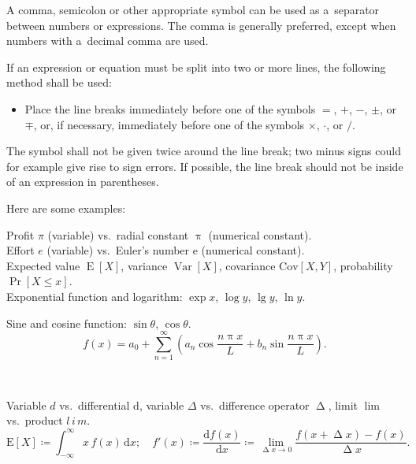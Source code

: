 \documentclass[11pt, a4paper, oneside]{article}
\newlength{\baselinedist}
\newlength{\smalllinespacing}
\renewenvironment{quotation}{%
	\list{}{%
		\baselineskip = \smalllinespacing%
		\leftmargin = \baselineskip%
		\rightmargin = \leftmargin%
		\listparindent = \smalllinespacing%
		\parsep = 0pt%
		\topsep = 0.5\baselinedist plus 3ex
	}%
	\item\relax%
}{%
	\endlist%
}
\newcommand{\dd}{\mathrm{d}}
\theoremstyle{Plain}
\theoremstyle{Definition}
\theoremstyle{Remark}
\begin{document}
\begin{quotation}
	A comma, semicolon or other appropriate symbol can be used as a~separator between numbers or expressions. The comma is generally preferred, except when numbers with a~decimal comma are used. \par
	If an expression or equation must be split into two or more lines, the following method shall be used:
	\begin{itemize}[leftmargin = \baselineskip, labelsep = 0.25\baselineskip]
		\item[---] Place the line breaks immediately before one of the symbols $=$, $+$, $-$, $\pm$, or $\mp$, or, if necessary, immediately before one of the symbols $\times$, $\cdot$, or $/$.
	\end{itemize}
	The symbol shall not be given twice around the line break; two minus signs could for example give rise to sign errors. If possible, the line break should not be inside of an expression in parentheses.
\end{quotation}

Here are some examples:

\begin{longtblr}{}
	Profit $\pi$ (variable) vs.\ radial constant $\uppi$ (numerical constant). \\
	Effort $e$ (variable) vs.\ Euler's number $\mathrm{e}$ (numerical constant). \\
	Expected value $\operatorname{E}[X]$, variance $\operatorname{Var}[X]$, covariance $\mathrm{Cov}[X, Y]$, probability $\Pr[{X \le x}]$. \\
	Exponential function and logarithm: $\exp x$, $\log y$, $\lg y$, $\ln y$. \\
	\begin{minipage}{\linewidth}\noindent\strut%
		Sine and cosine function: $\sin \theta$, $\cos \theta$.
		\begin{equation}
			f(x) = a_0 + \sum_{n=1}^\infty \left(a_n \cos \frac{n \uppi x}{L} + b_n \sin \frac{n \uppi x}{L} \right).
		\end{equation}
	\end{minipage} \\[\belowdisplayskip]
	\begin{minipage}{\linewidth}\noindent\strut%
		Variable $d$ vs.\ differential $\dd$, variable $\Delta$ vs.\ difference operator $\upDelta$, limit $\lim$ vs.\ product $l\,i\,m$.
		\begin{equation}
			\mathrm{E}[X] \coloneq \int_{-\infty}^{\infty} x\,f(x)\,\dd x; \quad
			f'(x) \coloneq \frac{\dd f(x)}{\dd x} \coloneq \lim_{\upDelta x \to 0} \frac{f(x + \upDelta x) - f(x)}{\upDelta x}.
		\end{equation}
	\end{minipage}\vspace{0.333\smallskipamount}
\end{longtblr}
\end{document}
